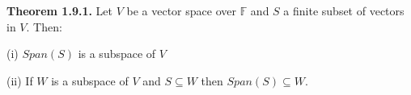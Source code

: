 \documentclass[10pt,landscape]{article}
\makeatletter
\renewcommand{\subsection}{\@startsection{subsection}{2}{0mm}%
                                {-1explus -.5ex minus -.2ex}%
                                {0.5ex plus .2ex}%
                                {\normalfont\normalsize\bfseries}}
\makeatother
\begin{document}
\begin{multicols}{4}




\textbf{Theorem 1.9.1.} Let $V$ be a vector space over $\mathbb{F}$ and $S$ a finite subset of vectors in $V$. Then:

(i) $Span(S)$ is a subspace of $V$

(ii) If $W$ is a subspace of $V$ and $S \subseteq W$ then $Span(S) \subseteq W$.










\end{multicols}
\end{document}
